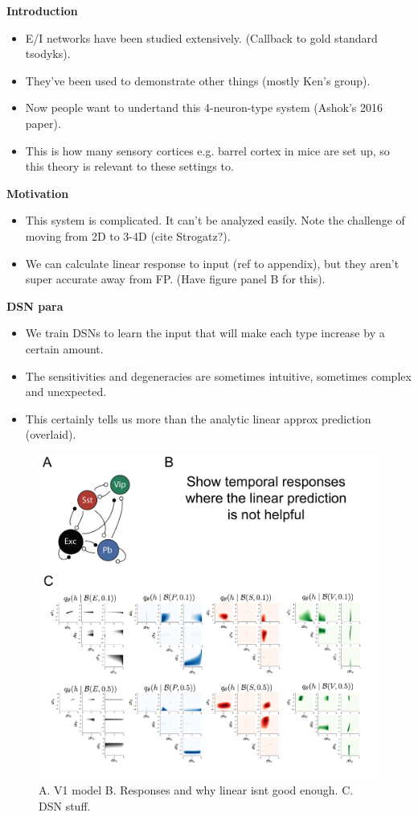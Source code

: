 \documentclass[11pt]{article}
\begin{document}
\textbf{Introduction}
\begin{itemize}
\item E/I networks have been studied extensively. (Callback to gold standard tsodyks).
\item They've been used to demonstrate other things (mostly Ken's group).
\item Now people want to undertand this 4-neuron-type system (Ashok's 2016 paper).  
\item This is how many sensory cortices e.g. barrel cortex in mice are set up, so this theory is relevant to these settings to.
\end{itemize}

\textbf{Motivation}
\begin{itemize}
\item This system is complicated.  It can't be analyzed easily.  Note the challenge of moving from 2D to 3-4D (cite Strogatz?).
\item We can calculate linear response to input (ref to appendix), but they aren't super accurate away from FP. (Have figure panel B for this).
\end{itemize}

\textbf{DSN para}
\begin{itemize}
\item We train DSNs to learn the input that will make each type increase by a certain amount.
\item The sensitivities and degeneracies are sometimes intuitive, sometimes complex and unexpected.
\item This certainly tells us more than the analytic linear approx prediction (overlaid).
\end{itemize}

\begin{figure}
\begin{center}
\includegraphics[scale=0.4]{figs/fig3/fig3.pdf}
\end{center}
\caption{A. V1 model B. Responses and why linear isnt good enough. C. DSN stuff.}
\end{figure}
\end{document}
